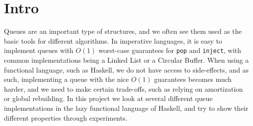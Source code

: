 \section{Intro}
Queues are an important type of structures, and we often see them used as the basic tools for different algorithms. In imperative languages, it is easy to implement queues with $O(1)$ worst-case guarantees for \texttt{pop} and \texttt{inject}, with common implementations being a Linked List or a Circular Buffer. When using a functional language, such as Haskell, we do not have access to side-effects, and as such, implementing a queue with the nice $O(1)$ guarantees becomes much harder, and we need to make certain trade-offs, such as relying on amortization or global rebuilding. In this project we look at several different queue implementations in the lazy functional language of Haskell, and try to show their different properties through experiments.
